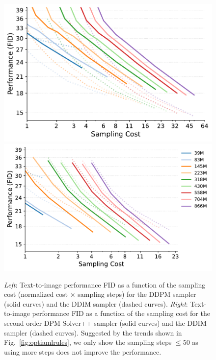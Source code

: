 \begin{figure}[ht]
    \centering
    \def\xwidth{.3\linewidth}
     \includegraphics[height=\xwidth]{cp2/figures/ddpm_analyze_inference_costs_B.pdf}
    \includegraphics[height=\xwidth]{cp2/figures/dpmsolver_plus_plus_analyze_inference_costs_B.pdf}
    \vspace{-.5\baselineskip}
    \caption{\emph{Left}: Text-to-image performance FID as a function of the sampling cost (normalized cost $\times$ sampling steps) for the DDPM sampler (solid curves) and the DDIM sampler (dashed curves). \emph{Right}: Text-to-image performance FID as a function of the sampling cost for the second-order DPM-Solver++ sampler (solid curves) and the DDIM sampler (dashed curves). Suggested by the trends shown in Fig.~\ref{fig:optiamlrules}, we only show the sampling steps $\leq 50$ as using more steps does not improve the performance.}
    \label{fig:scalingsampler}
    \vspace{-1\baselineskip}
\end{figure} 


